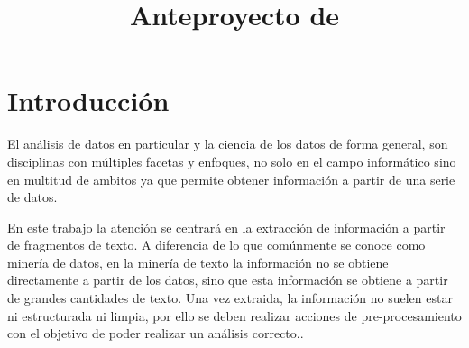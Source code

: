   
 
 

\graphicspath{{../Book/logos/}{../Book/figures/}{../Book/diagrams/}{../Book/photos/}}


\title{Anteproyecto de \mybookworktypefull}     
\date{\myanteproyectodate}          
\author{\mybookauthor}

                               



\maketitle

\begin{description}                             
\item[Título:] \mybooktitlespanish            
  {                                              
  \item[Título en inglés:] \mybooktitleenglish 
  }                                              
  {                                             
  }                                             
\item[Departamento:] \mybookdepartment          
\item[\expandafter\makefirstuc\expandafter{\mybookAutorOrAutora}:] \mybookauthor                  
\item[\expandafter\makefirstuc\expandafter{\mybookTutorOrTutores}:] \mybookadvisors                   
\end{description}                                 


\section{Introducción}
\label{sec:introduccion}

El análisis de datos en particular y la ciencia de los datos de forma general, son  disciplinas con múltiples 
facetas y enfoques, no solo en el campo informático sino en multitud de ambitos ya que permite 
obtener información a partir de una serie de datos.

En este trabajo la atención se centrará en la extracción de información a partir de fragmentos de texto.
A diferencia de lo que comúnmente se conoce como minería de datos, en la minería de texto la información 
no se obtiene directamente a partir de los datos, sino que esta información se obtiene a partir de grandes 
cantidades de texto. Una vez extraida, la información no suelen estar ni estructurada ni limpia, por ello se deben 
realizar acciones de pre-procesamiento con el objetivo de poder realizar un análisis correcto.\cite{datavstextmining}.

